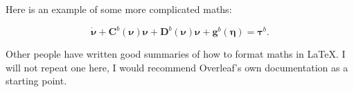 Here is an example of some more complicated maths:

\begin{equation}
    [\bm{M}^b_{RB}+\bm{M}^b_A]\bm{\dot{\nu}}+\bm{C}^b(\bm{\nu})\bm{\nu}+\bm{D}^b(\bm{\nu})\bm{\nu}+\bm{g}^b(\bm{\eta})=\bm{\tau}^b.
\end{equation}

Other people have written good summaries of how to format maths in \LaTeX{}. I will not repeat one here, I would recommend Overleaf's own documentation as a starting point. 